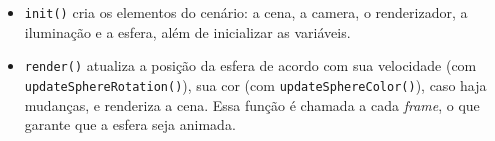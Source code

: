 \documentclass[a4paper,12pt]{article}
\newcommand{\code}[1]{\lstinline[mathescape=true, columns=fixed, basicstyle={\small\ttfamily}]{#1}}
\begin{document}
\begin{itemize}
  \item \code{init()} cria os elementos do cenário: a cena, a camera, o renderizador, a iluminação e a esfera, além de inicializar as variáveis.

  \item \code{render()} atualiza a posição da esfera de acordo com sua velocidade (com \code{updateSphereRotation()}), sua cor (com \code{updateSphereColor()}), caso haja mudanças, e renderiza a cena. Essa função é chamada a cada \emph{frame}, o que garante que a esfera seja animada.
\end{itemize}









\end{document}
